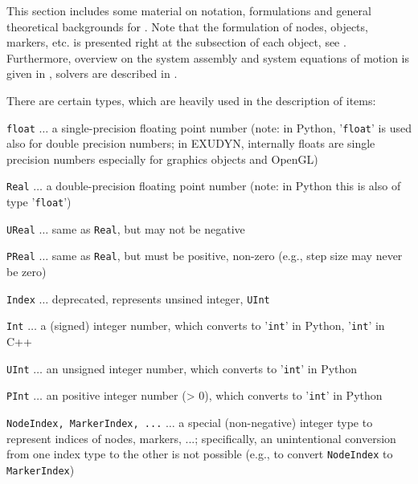 

This section includes some material on notation, formulations and general theoretical backgrounds for \codeName .
Note that the formulation of nodes, objects, markers, etc. is presented right at the subsection of each object, see .
Furthermore, overview on the system assembly and system equations of motion is given in ,
solvers are described in .

\label{sec:itemnotation}
%
%
There are certain types, which are heavily used in the description of items:
\bi
  \item \texttt{float} $\ldots$ a single-precision floating point number (note: in Python, '\texttt{float}' is used also for double precision numbers; in EXUDYN, internally floats are single precision numbers especially for graphics objects and OpenGL)
  \item \texttt{Real} $\ldots$ a double-precision floating point number (note: in Python this is also of type '\texttt{float}')
  \item \texttt{UReal} $\ldots$ same as \texttt{Real}, but may not be negative
  \item \texttt{PReal} $\ldots$ same as \texttt{Real}, but must be positive, non-zero (e.g., step size may never be zero)
  \item \texttt{Index} $\ldots$ deprecated, represents unsined integer, \texttt{UInt}
  \item \texttt{Int} $\ldots$ a (signed) integer number, which converts to '\texttt{int}' in Python, '\texttt{int}' in C++
  \item \texttt{UInt} $\ldots$ an unsigned integer number, which converts to '\texttt{int}' in Python
  \item \texttt{PInt} $\ldots$ an positive integer number (> 0), which converts to '\texttt{int}' in Python
  \item \texttt{NodeIndex, MarkerIndex, ...} $\ldots$ a special (non-negative) integer type to represent indices of nodes, markers, ...; specifically, an unintentional conversion from one index type to the other is not possible (e.g., to convert \texttt{NodeIndex} to \texttt{MarkerIndex})
